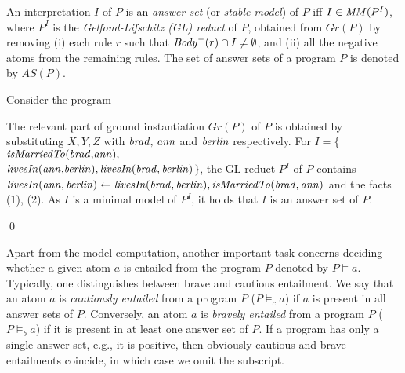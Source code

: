\begin{definition}
An interpretation $I$ of $P$ is an \emph{answer set} (or \emph{stable model}) of $P$ iff $I \in \mathit{MM}(P^I)$, where $P^I$ is the \emph{Gelfond-Lifschitz (GL) reduct} of $P$, obtained from $Gr(P)$ by removing (i) each rule $r$ such that $\mathit{Body}^-(r) \cap I\neq\emptyset$, and (ii) all the negative atoms from the remaining rules. The set of answer sets of a program $P$ is denoted by $AS(P)$.
\end{definition}



\begin{example}\label{ex:as}
Consider the program \\
{\small {}}
            
\normalsize
{\smallskip

\noindent            
The relevant part of ground instantiation $Gr(P)$ of $P$ is obtained by substituting $X,Y,Z$ with $\mathit{brad, \,ann}$ and $\mathit{berlin}$ respectively. For $I=\{${\small$\mathit{isMarriedTo(brad{,}ann){,}}$\\$\mathit{livesIn(ann{,}berlin)},\mathit{livesIn(brad,berlin)}$}$\}$, the GL-reduct $P^I$ of $P$ contains \\\small{$\mathit{livesIn(ann,berlin)}\leftarrow \mathit{livesIn(brad,berlin),isMarriedTo(brad,ann)}$} \normalsize{and the facts (1), (2). As $I$ is a minimal model of $P^I$, it holds that $I$ is an answer set of $P$.}}\qed
\end{example}
\normalsize

Apart from the model computation, another important task concerns deciding whether a given atom $a$ is entailed from the program $P$ denoted by $P \models a$. Typically, one distinguishes between brave and cautious entailment. We say that an atom $a$ is \emph{cautiously entailed} from a program $P$ ($P \models_c a$) if $a$ is present in all answer sets of $P$. Conversely, an atom $a$ is \emph{bravely entailed} from a program $P$ ($P \models_b a$) if it is present in at least one answer set of $P$. If a program has only a single answer set, e.g., it is positive, then obviously cautious and brave entailments coincide, in which case we omit the subscript.

